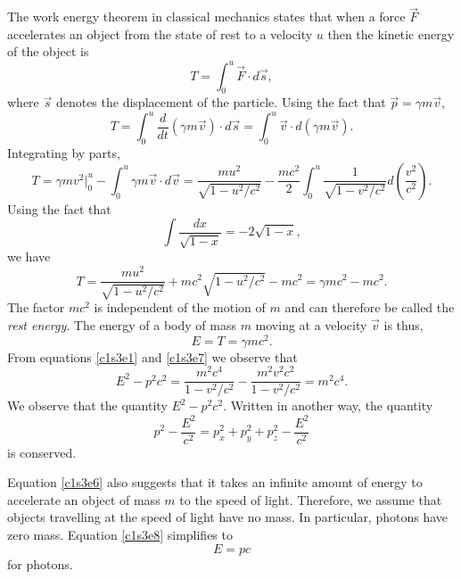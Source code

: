 The work energy theorem in classical mechanics states that when a force 
$\vec{F}$ accelerates an object from the state of rest to a velocity $u$ then
the kinetic energy of the object is
\begin{equation}\label{c1s3e5}
T = \int_0^u \vec{F}\cdot d\vec{s},
\end{equation}
where $\vec{s}$ denotes the displacement of the particle. Using the fact that
$\vec{p} = \gamma m\vec{v}$,
\[
T = \int_0^u \frac{d}{dt}(\gamma m\vec{v})\cdot d\vec{s} = 
\int_0^u \vec{v}\cdot d(\gamma m\vec{v}).
\]
Integrating by parts,
\[
T = \gamma mv^2\Big|_0^u - \int_0^u \gamma m\vec{v}\cdot d\vec{v} =
\frac{mu^2}{\sqrt{1 - u^2/c^2}} - \frac{mc^2}{2}\int_0^u 
\frac{1}{\sqrt{1 - v^2/c^2}}d\left(\frac{v^2}{c^2}\right).
\]
Using the fact that
\[
\int\frac{dx}{\sqrt{1 - x}} = -2\sqrt{1 - x},
\]
we have
\begin{equation}\label{c1s3e6}
T = \frac{mu^2}{\sqrt{1 - u^2/c^2}} + mc^2\sqrt{1 - u^2/c^2} - mc^2
= \gamma mc^2 - mc^2.
\end{equation}
The factor $mc^2$ is independent of the motion of $m$ and can therefore be
called the \emph{rest energy}. The energy of a body of mass $m$ moving at a 
velocity $\vec{v}$ is thus,
\begin{equation}\label{c1s3e7}
E = T = \gamma mc^2.
\end{equation}
From equations \eqref{c1s3e1} and \eqref{c1s3e7} we observe that
\begin{equation}\label{c1s3e8}
E^2 - p^2c^2 = \frac{m^2c^4}{1 - v^2/c^2} - \frac{m^2v^2c^2}{1 - v^2/c^2} = 
m^2c^4.
\end{equation}
We observe that the quantity $E^2 - p^2c^2$. Written in another way, the 
quantity
\begin{equation}\label{c1s3e9}
p^2 - \frac{E^2}{c^2} = p_x^2 + p_y^2 + p_z^2 - \frac{E^2}{c^2}
\end{equation}
is conserved.

Equation \eqref{c1s3e6} also suggests that it takes an infinite amount of
energy to accelerate an object of mass $m$ to the speed of light. Therefore,
we assume that objects travelling at the speed of light have no mass. In
particular, photons have zero mass. Equation \eqref{c1s3e8} simplifies to
\begin{equation}\label{c1s3e10}
E = pc
\end{equation}
for photons.

